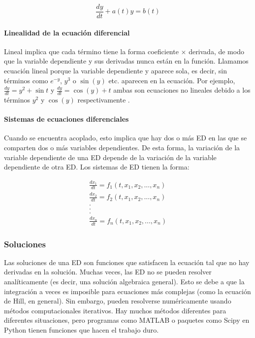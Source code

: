 \documentclass[11pt, letterpaper, spanish]{article}
\begin{document}
    \begin{equation}
        \frac{d y}{d t}+a(t) y =b(t)
        \label{eqhomo2}
    \end{equation}

    
    \paragraph{ Linealidad de la ecuación diferencial}
     \par{Lineal implica que cada término tiene la forma coeficiente × derivada, de modo que la variable dependiente y sus derivadas nunca están en la función. Llamamos ecuación lineal porque la variable dependiente y aparece sola, es decir, sin términos como $e^{-y}$, $y^3$ o $\sin{(y)}$ etc. aparecen en la ecuación. Por ejemplo, $\frac{dy}{dt} = y^2 + \sin{t}$ y $\frac{dy}{dt} = \cos{(y)} + t$ ambas son ecuaciones no lineales debido a los términos $y^2$ y $\cos{(y)}$ respectivamente \cite{braun_1993}. 

     \paragraph{ Sistemas de ecuaciones diferenciales }
    
    \par{Cuando se encuentra acoplado, esto implica que hay dos o más ED en las que se comparten dos o más variables dependientes. De esta forma, la variación de la variable dependiente de una ED depende de la variación de la variable dependiente de otra ED. Los sistemas de ED tienen la forma: }

    \begin{equation}
    \begin{split}
    \frac{d x_1}{dt}=f_1(t,x_1,x_2,...,x_n)\\
    \frac{d x_2}{dt}=f_2(t,x_1,x_2,...,x_n)\\
    . \\
    . \\
    . \\ 
    \frac{d x_n}{dt}=f_n(t,x_1,x_2,...,x_n)
    \end{split}
    \end{equation}

    \subsubsection{Soluciones}
     \par{Las soluciones de una ED son funciones que satisfacen la ecuación tal que no hay derivadas en la solución. Muchas veces, las ED no se pueden resolver analíticamente (es decir, una solución algebraica general). Esto se debe a que la integración a veces es imposible para ecuaciones más complejas (como la ecuación de Hill, en general). Sin embargo, pueden resolverse numéricamente usando métodos computacionales iterativos. Hay muchos métodos diferentes para diferentes situaciones, pero programas como MATLAB o paquetes como Scipy en Python tienen funciones que hacen el trabajo duro.}

}
\end{document}

